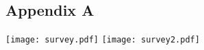 \documentclass[draft,final]{vutinfth} %
\begin{document}
\begin{abstract}
\end{abstract}


\tableofcontents %

\mainmatter





 







%

%





% 

\backmatter

\listoffigures %

\cleardoublepage %
\listoftables %







\begin{appendices}
	\chapter{Appendix A}
	\label{chap:appendixA}
	\texttt{[image: survey.pdf]}
	\texttt{[image: survey2.pdf]}
\end{appendices}
\end{document}
